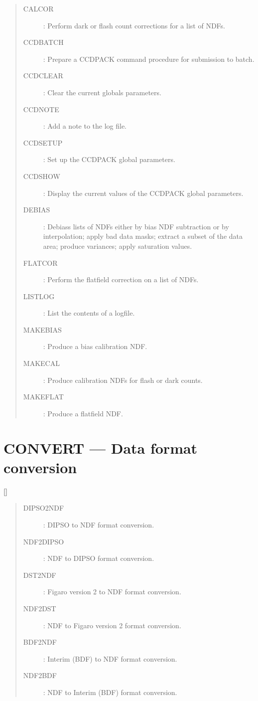 \begin{quote}
\begin{description}
\item [CALCOR] : Perform dark or flash count corrections for a list of NDFs.
\item [CCDBATCH] : Prepare a CCDPACK command procedure for submission to batch.
\item [CCDCLEAR] : Clear the current globals parameters.
\item [CCDNOTE] : Add a note to the log file.
\item [CCDSETUP] : Set up the CCDPACK global parameters.
\item [CCDSHOW] : Display the current values of the CCDPACK global parameters.
\item [DEBIAS] : Debiass lists of NDFs either by bias NDF subtraction or by
 interpolation; apply bad data masks; extract a subset of the data area;
 produce variances; apply saturation values.
\item [FLATCOR] : Perform the flatfield correction on a list of NDFs.
\item [LISTLOG] : List the contents of a logfile.
\item [MAKEBIAS] : Produce a bias calibration NDF.
\item [MAKECAL] : Produce calibration NDFs for flash or dark counts.
\item [MAKEFLAT] : Produce a flatfield NDF.
\end{description}
\end{quote}

\newpage

\section{CONVERT --- Data format conversion}

\vspace{-10mm}

\hfill []

\vspace{2mm}

\begin{quote}
\begin{description}
\item [DIPSO2NDF] : DIPSO to NDF format conversion.
\item [NDF2DIPSO] : NDF to DIPSO format conversion.
\\
\item [DST2NDF] : Figaro version 2 to NDF format conversion.
\item [NDF2DST] : NDF to Figaro version 2 format conversion.
\\
\item [BDF2NDF] : Interim (BDF) to NDF format conversion.
\item [NDF2BDF] : NDF to Interim (BDF) format conversion.
\end{description}
\end{quote}

